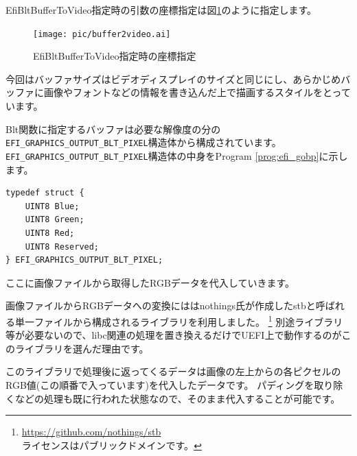 \documentclass[10pt,b5paper,twoside,openany]{ltjsbook}
\begin{document}
EfiBltBufferToVideo指定時の引数の座標指定は図\ref{fig:buffer2video}のように指定します。
\begin{figure}[H]
    \centering
    \texttt{[image: pic/buffer2video.ai]}
    \caption{EfiBltBufferToVideo指定時の座標指定}
    \label{fig:buffer2video}
\end{figure}
今回はバッファサイズはビデオディスプレイのサイズと同じにし、あらかじめバッファに画像やフォントなどの情報を書き込んだ上で描画するスタイルをとっています。

Blt関数に指定するバッファは必要な解像度の分の\verb+EFI_GRAPHICS_OUTPUT_BLT_PIXEL+構造体から構成されています。
\verb+EFI_GRAPHICS_OUTPUT_BLT_PIXEL+構造体の中身をProgram \ref{prog:efi_gobp}に示します。
\begin{lstlisting}[style=customC,caption=EFI\_GRAPHICS\_OUTPUT\_BLT\_PIXEL,label=prog:efi_gobp]
typedef struct {
    UINT8 Blue;
    UINT8 Green;
    UINT8 Red;
    UINT8 Reserved;
} EFI_GRAPHICS_OUTPUT_BLT_PIXEL;
\end{lstlisting}
ここに画像ファイルから取得したRGBデータを代入していきます。

画像ファイルからRGBデータへの変換にははnothings氏が作成したstbと呼ばれる単一ファイルから構成されるライブラリを利用しました。
\footnote{\url{https://github.com/nothings/stb} \\ ライセンスはパブリックドメインです。}
別途ライブラリ等が必要ないので、libc関連の処理を置き換えるだけでUEFI上で動作するのがこのライブラリを選んだ理由です。

このライブラリで処理後に返ってくるデータは画像の左上からの各ピクセルのRGB値(この順番で入っています)を代入したデータです。
パディングを取り除くなどの処理も既に行われた状態なので、そのまま代入することが可能です。
\end{document}

